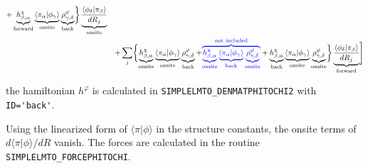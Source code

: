 \documentclass[11pt,a4paper]{report}
\begin{document}
\begin{eqnarray}
+
\underbrace{h^{\chi}_{\beta,\alpha}}_{\text{forward}}
\underbrace{\langle\pi_\alpha|\phi_\gamma\rangle}_{\text{onsite}}
\underbrace{\rho^{\varphi}_{\gamma,\delta}}_{\text{back}}
%
\biggr\rbrace 
\underbrace{\frac{\langle\phi_\delta|\pi_\beta\rangle}{dR_j}}_{\text{onsite}}
\nonumber\\
&&+
\sum_j\biggl\lbrace
\underbrace{h^{\chi}_{\beta,\alpha}}_{\text{onsite}}
\underbrace{\langle\pi_\alpha|\phi_\gamma\rangle}_{\text{onsite}}
\underbrace{\rho^{\varphi}_{\gamma,\delta}}_{\text{back}}
+
\textcolor{blue}{\overbrace{
\underbrace{h^{\chi}_{\beta,\alpha}}_{\text{onsite}}
\underbrace{\langle\pi_\alpha|\phi_\gamma\rangle}_{\text{back}}
\underbrace{\rho^{\varphi}_{\gamma,\delta}}_{\text{onsite}}
}^{\text{not included}}}
+
\underbrace{h^{\chi}_{\beta,\alpha}}_{\text{back}}
\underbrace{\langle\pi_\alpha|\phi_\gamma\rangle}_{\text{onsite}}
\underbrace{\rho^{\varphi}_{\gamma,\delta}}_{\text{onsite}}
%
\biggr\rbrace 
\underbrace{
\frac{\langle\phi_\delta|\pi_\beta\rangle}{dR_j}
}_{\text{forward}}
\Biggr]
\nonumber\\
\end{eqnarray}

the hamiltonian $h^{\varphi}$ is calculated in
\verb|SIMPLELMTO_DENMATPHITOCHI2| with \verb|ID='back'|.

Using the linearized form of $\langle\pi|\phi\rangle$ in the structure
constants, the onsite terms of $d\langle\pi|\phi\rangle/dR$ vanish.
The forces are calculated in the routine \verb|SIMPLELMTO_FORCEPHITOCHI|.



\end{document}
